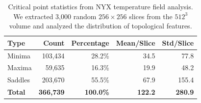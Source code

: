 \begin{table}[h]
\centering
\caption{Critical point statistics from NYX temperature field analysis. We extracted 3,000 random $256 \times 256$ slices from the $512^3$ volume and analyzed the distribution of topological features.}
\label{tab:cp-stats}
\begin{tabular}{lrrrr}
\toprule
Type & Count & Percentage & Mean/Slice & Std/Slice \\
\midrule
Minima & 103,434 & 28.2\% & 34.5 & 77.8 \\
Maxima & 59,635 & 16.3\% & 19.9 & 48.2 \\
Saddles & 203,670 & 55.5\% & 67.9 & 155.4 \\
\midrule
\textbf{Total} & \textbf{366,739} & \textbf{100.0\%} & \textbf{122.2} & \textbf{280.9} \\
\bottomrule
\end{tabular}
\end{table}
